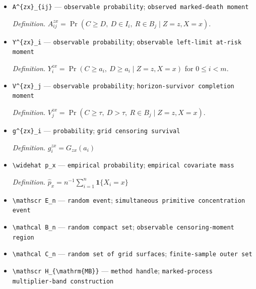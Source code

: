 \documentclass{article}
\begin{document}
\begin{itemize}
  \item \texttt{A\textasciicircum{}\{zx\}\allowbreak{}\_\allowbreak{}\{ij\}\allowbreak{}} --- \texttt{observable probability}; \texttt{observed marked-\allowbreak{}death moment}
  \par\smallskip\noindent\emph{Definition.} \(A^{zx}_{ij}=\Pr(C\geq D,\ D\in I_i,\ R\in B_j\mid Z=z,X=x)\).
  \item \texttt{Y\textasciicircum{}\{zx\}\allowbreak{}\_\allowbreak{}i} --- \texttt{observable probability}; \texttt{observable left-\allowbreak{}limit at-\allowbreak{}risk moment}
  \par\smallskip\noindent\emph{Definition.} \(Y^{zx}_i=\Pr(C\geq a_i,\ D\geq a_i\mid Z=z,X=x)\) for \(0\leq i<m\).
  \item \texttt{V\textasciicircum{}\{zx\}\allowbreak{}\_\allowbreak{}j} --- \texttt{observable probability}; \texttt{horizon-\allowbreak{}survivor completion moment}
  \par\smallskip\noindent\emph{Definition.} \(V^{zx}_j=\Pr(C\geq\tau,\ D>\tau,\ R\in B_j\mid Z=z,X=x)\).
  \item \texttt{g\textasciicircum{}\{zx\}\allowbreak{}\_\allowbreak{}i} --- \texttt{probability}; \texttt{grid censoring survival}
  \par\smallskip\noindent\emph{Definition.} \(g^{zx}_i=G_{zx}(a_i)\)
  \item \texttt{\textbackslash{}\allowbreak{}widehat p\_\allowbreak{}x} --- \texttt{empirical probability}; \texttt{empirical covariate mass}
  \par\smallskip\noindent\emph{Definition.} \(\widehat p_x=n^{-1}\sum_{i=1}^n\mathbf 1\{X_i=x\}\)
  \item \texttt{\textbackslash{}\allowbreak{}mathscr E\_\allowbreak{}n} --- \texttt{random event}; \texttt{simultaneous primitive concentration event}
  \item \texttt{\textbackslash{}\allowbreak{}mathcal B\_\allowbreak{}n} --- \texttt{random compact set}; \texttt{observable censoring-\allowbreak{}moment region}
  \item \texttt{\textbackslash{}\allowbreak{}mathcal C\_\allowbreak{}n} --- \texttt{random set of grid surfaces}; \texttt{finite-\allowbreak{}sample outer set}
  \item \texttt{\textbackslash{}\allowbreak{}mathscr H\_\allowbreak{}\{\textbackslash{}\allowbreak{}mathrm\{MB\}\allowbreak{}\}\allowbreak{}} --- \texttt{method handle}; \texttt{marked-\allowbreak{}process multiplier-\allowbreak{}band construction}
\end{itemize}
\end{document}
